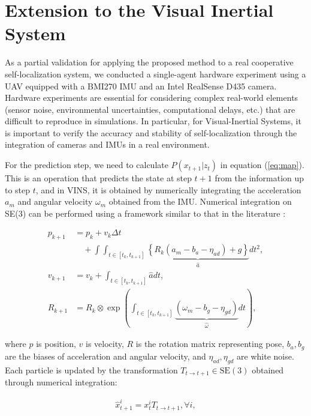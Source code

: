 \documentclass[a4paper,fleqn,10pt,twocolumn]{SICE_ISCS}
\begin{document}
\section{Extension to the Visual Inertial System}

As a partial validation for applying the proposed method to a real cooperative self-localization system, we conducted a single-agent hardware experiment using a UAV equipped with a BMI270 IMU and an Intel RealSense D435 camera.
Hardware experiments are essential for considering complex real-world elements (sensor noise, environmental uncertainties, computational delays, etc.) that are difficult to reproduce in simulations. In particular, for Visual-Inertial Systems, it is important to verify the accuracy and stability of self-localization through the integration of cameras and IMUs in a real environment.

For the prediction step, we need to calculate $P(x_{t+1}|z_t)$ in equation (\ref{eq:map}). This is an operation that predicts the state at step $t+1$ from the information up to step $t$, and in VINS, it is obtained by numerically integrating the acceleration $a_m$ and angular velocity $\omega_m$ obtained from the IMU. Numerical integration on SE(3) can be performed using a framework similar to that in the literature \cite{Forster2017}:

\begin{equation}
\begin{aligned}\label{eq:predict}
p_{k+1} &=p_{k} + v_{k}\Delta t \\
&\quad+ \int\!\!\!\int_{t\in [t_k,t_{k+1}]} \underbrace{\left \{ R_{k}(a_m-b_a-\eta_{ad})+g\right \}}_{\hat a}dt^2,\\
v_{k+1} &=v_{k} + \int_{t\in [t_k,t_{k+1}]} \hat a dt,\\
R_{k+1} &=R_{k} \otimes \exp \left( \int_{t\in [t_k,t_{k+1}]} \underbrace{(\omega_m-b_g-\eta_{gd})}_{\hat \omega} dt \right),
\end{aligned}
\end{equation}

where $p$ is position, $v$ is velocity, $R$ is the rotation matrix representing pose, $b_a, b_g$ are the biases of acceleration and angular velocity, and $\eta_{ad}, \eta_{gd}$ are white noise.
Each particle is updated by the transformation $T_{t\rightarrow t+1}\in \text{SE}(3)$ obtained through numerical integration:

\begin{equation}
\begin{aligned}\label{eq:step}
\hat x_{t+1}^i = x_{t}^i T_{t\rightarrow t+1}, \forall i,
\end{aligned}
\end{equation}
\end{document}
